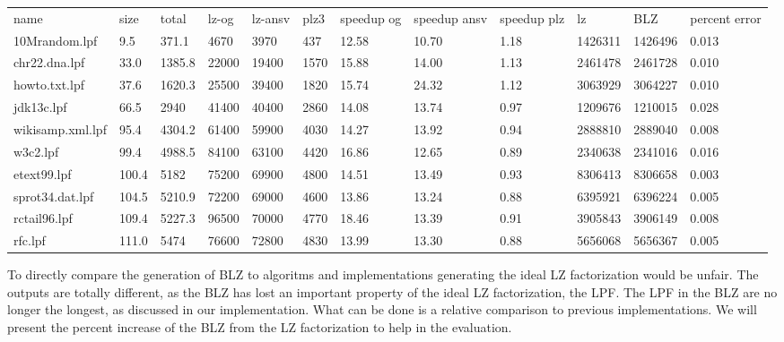 \begin{table}[h]
\begin{tabular}{llllllllllll}
name             & size  & total  & lz-og & lz-ansv & plz3 & speedup og & speedup ansv & speedup plz & lz      & BLZ     & percent error \\
10Mrandom.lpf    & 9.5   & 371.1  & 4670  & 3970    & 437  & 12.58      & 10.70        & 1.18        & 1426311 & 1426496 & 0.013         \\
chr22.dna.lpf    & 33.0  & 1385.8 & 22000 & 19400   & 1570 & 15.88      & 14.00        & 1.13        & 2461478 & 2461728 & 0.010         \\
howto.txt.lpf    & 37.6  & 1620.3 & 25500 & 39400   & 1820 & 15.74      & 24.32        & 1.12        & 3063929 & 3064227 & 0.010         \\
jdk13c.lpf       & 66.5  & 2940   & 41400 & 40400   & 2860 & 14.08      & 13.74        & 0.97        & 1209676 & 1210015 & 0.028         \\
wikisamp.xml.lpf & 95.4  & 4304.2 & 61400 & 59900   & 4030 & 14.27      & 13.92        & 0.94        & 2888810 & 2889040 & 0.008         \\
w3c2.lpf         & 99.4  & 4988.5 & 84100 & 63100   & 4420 & 16.86      & 12.65        & 0.89        & 2340638 & 2341016 & 0.016         \\
etext99.lpf      & 100.4 & 5182   & 75200 & 69900   & 4800 & 14.51      & 13.49        & 0.93        & 8306413 & 8306658 & 0.003         \\
sprot34.dat.lpf  & 104.5 & 5210.9 & 72200 & 69000   & 4600 & 13.86      & 13.24        & 0.88        & 6395921 & 6396224 & 0.005         \\
rctail96.lpf     & 109.4 & 5227.3 & 96500 & 70000   & 4770 & 18.46      & 13.39        & 0.91        & 3905843 & 3906149 & 0.008         \\
rfc.lpf          & 111.0 & 5474   & 76600 & 72800   & 4830 & 13.99      & 13.30        & 0.88        & 5656068 & 5656367 & 0.005        
\end{tabular}
\end{table}

To directly compare the generation of BLZ to algoritms and implementations generating the ideal LZ factorization would be unfair.
The outputs are totally different, as the BLZ has lost an important property of the ideal LZ factorization, the LPF.
The LPF in the BLZ are no longer the longest, as discussed in our implementation.
What can be done is a relative comparison to previous implementations.
We will present the percent increase of the BLZ from the LZ factorization to help in the evaluation.

